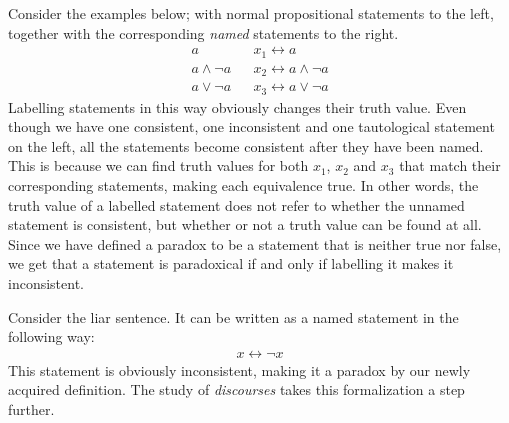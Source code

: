Consider the examples below; with normal propositional statements to the left, together with the corresponding \textit{named} statements to the right.
\begin{align}
  a               && x_1 \leftrightarrow a\\
  a \wedge \neg a && x_2 \leftrightarrow a \wedge \neg a\\
  a \vee \neg a   && x_3 \leftrightarrow a \vee \neg a
\end{align}
Labelling statements in this way obviously changes their truth value.
Even though we have one consistent, one inconsistent and one tautological statement on the left, all the statements become consistent after they have been named.
This is because we can find truth values for both $x_1$, $x_2$ and $x_3$ that match their corresponding statements, making each equivalence true.
In other words, the truth value of a labelled statement does not refer to whether the unnamed statement is consistent, but whether or not a truth value can be found at all.
Since we have defined a paradox to be a statement that is neither true nor false, we get that a statement is paradoxical if and only if labelling it makes it inconsistent.

Consider the liar sentence.  It can be written as a named statement in the following way:
\begin{align}
  x \leftrightarrow \neg x
\end{align}
This statement is obviously inconsistent, making it a paradox by our newly acquired definition.  The study of \textit{discourses} takes this formalization a step further.
